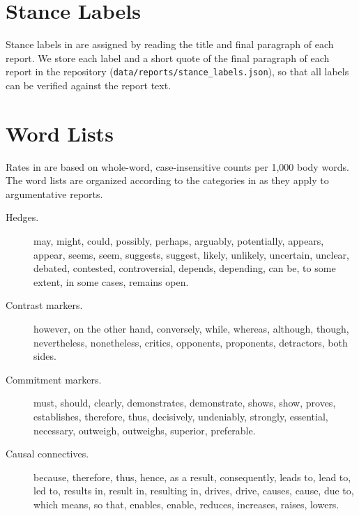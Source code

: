 \begin{table}[t]
\centering
\small

\caption{Word count and number of unique sources cited in the body of each report retained in the analysis. For \sys{} we also include the number of sources listed in the bibliography.}
\label{tab:reports}
\end{table}

\section{Stance Labels}
\label{app:stance}
Stance labels in  are assigned by reading the title and final paragraph of each \sys{} report. We store each label and a short quote of the final paragraph of each report in the repository (\texttt{data/reports/stance\_labels.json}), so that all labels can be verified against the report text.

\section{Word Lists}
\label{app:lexicon}
Rates in  are based on whole-word, case-insensitive counts per 1{,}000 body words. The word lists are organized according to the categories in \citet{hyland2005metadiscourse} as they apply to argumentative reports.
\begin{description}
\item[Hedges.] may, might, could, possibly, perhaps, arguably, potentially, appears, appear, seems, seem, suggests, suggest, likely, unlikely, uncertain, unclear, debated, contested, controversial, depends, depending, can be, to some extent, in some cases, remains open.
\item[Contrast markers.] however, on the other hand, conversely, while, whereas, although, though, nevertheless, nonetheless, critics, opponents, proponents, detractors, both sides.
\item[Commitment markers.] must, should, clearly, demonstrates, demonstrate, shows, show, proves, establishes, therefore, thus, decisively, undeniably, strongly, essential, necessary, outweigh, outweighs, superior, preferable.
\item[Causal connectives.] because, therefore, thus, hence, as a result, consequently, leads to, lead to, led to, results in, result in, resulting in, drives, drive, causes, cause, due to, which means, so that, enables, enable, reduces, increases, raises, lowers.
\end{description}

